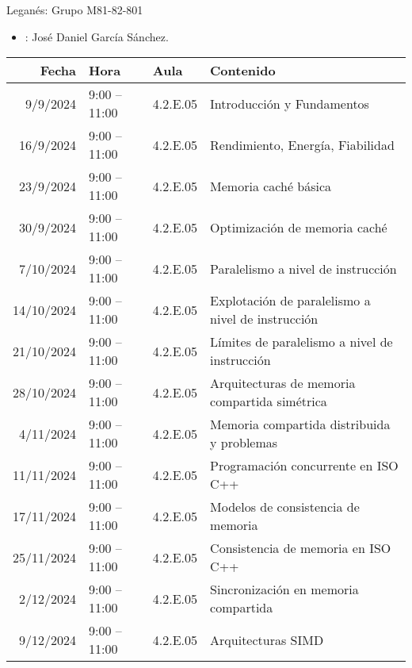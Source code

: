 \begin{frame}[t,plain,shrink=20]{Leganés: Grupo M81-82-801}
\begin{itemize}
  \item {}: José Daniel García Sánchez.
\end{itemize}
\vspace{2em}
\begin{tabular}{|r|l|l|l|}
\hline
Fecha & Hora & Aula & Contenido\\
\hline\hline

9/9/2024 & 9:00 -- 11:00 & 4.2.E.05 & Introducción y Fundamentos\\
\hline
16/9/2024 & 9:00 -- 11:00 & 4.2.E.05 & Rendimiento, Energía, Fiabilidad\\
\hline
23/9/2024 & 9:00 -- 11:00 & 4.2.E.05 & Memoria caché básica\\
\hline
30/9/2024 & 9:00 -- 11:00 & 4.2.E.05 & Optimización de memoria caché\\
\hline
7/10/2024 & 9:00 -- 11:00 & 4.2.E.05 & Paralelismo a nivel de instrucción\\
\hline
14/10/2024 & 9:00 -- 11:00 & 4.2.E.05 & Explotación de paralelismo a nivel de instrucción\\
\hline
21/10/2024 & 9:00 -- 11:00 & 4.2.E.05 & Límites de paralelismo a nivel de instrucción\\
\hline
28/10/2024 & 9:00 -- 11:00 & 4.2.E.05 & Arquitecturas de memoria compartida simétrica\\
\hline
4/11/2024 & 9:00 -- 11:00 & 4.2.E.05 & Memoria compartida distribuida y problemas\\
\hline
11/11/2024 & 9:00 -- 11:00 & 4.2.E.05 & Programación concurrente en ISO C++\\
\hline
17/11/2024 & 9:00 -- 11:00 & 4.2.E.05 & Modelos de consistencia de memoria\\
\hline
25/11/2024 & 9:00 -- 11:00 & 4.2.E.05 & Consistencia de memoria en ISO C++\\
\hline
2/12/2024 & 9:00 -- 11:00 & 4.2.E.05 & Sincronización en memoria compartida\\
\hline
9/12/2024 & 9:00 -- 11:00 & 4.2.E.05 & Arquitecturas SIMD\\
\hline

\end{tabular}
\end{frame}


